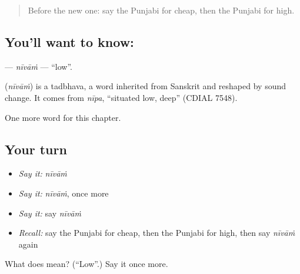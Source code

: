 \label{lesson:PA-C81-nivam}



\begin{quote}
Before the new one: say the Punjabi for cheap, then the Punjabi for high.
\end{quote}

\subsection*{You'll want to know: }
\textbf{} — \emph{nīvāṁ} — \textquotedblleft{}low\textquotedblright{}.

\begin{cousinweb}
\textbf{} (\emph{nīvāṁ}) is a tadbhava, a word inherited from Sanskrit and reshaped by sound change. It comes from \emph{nīpa}, \textquotedblleft{}situated low, deep\textquotedblright{} (CDIAL 7548).
\end{cousinweb}

\begin{grammarlens}[title={What you've built}]
One more word for this chapter.
\end{grammarlens}

\subsection*{Your turn}
\begin{itemize}
\raggedright
  \item \emph{Say it:} \emph{nīvāṁ}
  \item \emph{Say it:} \emph{nīvāṁ}, once more
  \item \emph{Say it:} say \emph{nīvāṁ}
  \item \emph{Recall:} say the Punjabi for cheap, then the Punjabi for high, then say \emph{nīvāṁ} again
\end{itemize}

\begin{tcolorbox}[breakable,colback=teal!4,colframe=teal!35!black,title={Before you move on}]
What does  mean? (\textquotedblleft{}Low\textquotedblright{}.) Say it once more.
\end{tcolorbox}
